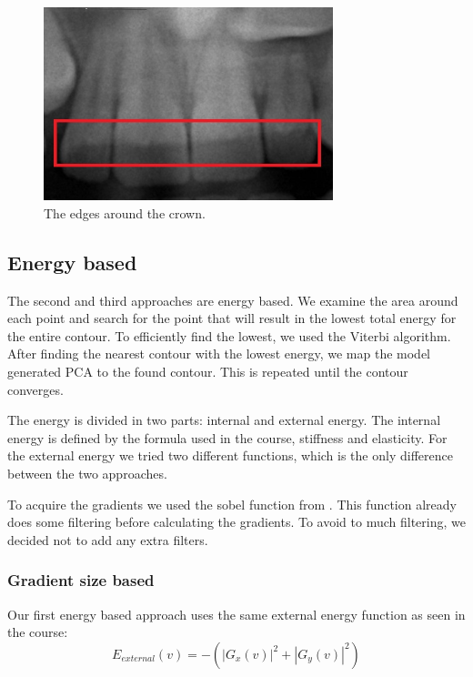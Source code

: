 \documentclass[a4paper,10pt]{article}
\begin{document}
\begin{figure}[h!]
  \centering
    \includegraphics[width=0.75\textwidth]{images/internalEdge.jpg}
  \caption{The edges around the crown.}
  \label{fig:InternalEdge}
\end{figure}

\subsection{Energy based}\label{sec:fit_energy}
The second and third approaches are energy based. We examine the area around each point and search for the point that will result in the lowest total energy for the entire contour. To efficiently find the lowest, we used the Viterbi algorithm. After finding the nearest contour with the lowest energy, we map the model generated PCA to the found contour. This is repeated until the contour converges.

The energy is divided in two parts: internal and external energy. The internal energy is defined by the formula used in the course, stiffness and elasticity. For the external energy we tried two different functions, which is the only difference between the two approaches.

To acquire the gradients we used the sobel function from \cite{PythonFilters}. This function already does some filtering before calculating the gradients. To avoid to much filtering, we decided not to add any extra filters.

\subsubsection{Gradient size based}
Our first energy based approach uses the same external energy function as seen in the course:
\begin{equation}
E_{external}(v) = - ( |G_{x}(v)|^2 + |G_{y}(v)|^2 )
\end{equation}
\end{document}
